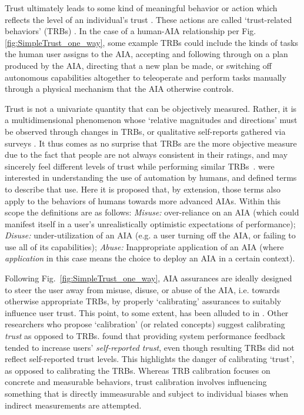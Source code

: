 Trust ultimately leads to some kind of meaningful behavior or action which reflects the level of an individual's trust \cite{Lewis1985-pr}. 
These actions are called `trust-related behaviors' (TRBs) \cite{McKnight2001-fa}. 
In the case of a human-AIA relationship per Fig. \ref{fig:SimpleTrust_one_way}, 
some example TRBs could include the kinds of tasks the human user assigns to the AIA, accepting and following through on a plan produced by the AIA, directing that a new plan be made, or switching off autonomous capabilities altogether to teleoperate and perform tasks manually through a physical mechanism that the AIA otherwise controls.  

Trust is not a univariate quantity that can be objectively measured. Rather, it is a multidimensional phenomenon whose `relative magnitudes and directions' must be observed through changes in TRBs, or qualitative self-reports gathered via surveys \cite{Muir1996-gt}. It thus comes as no surprise that TRBs are the more objective measure due to the fact that people are not always consistent in their ratings, and may sincerely feel different levels of trust while performing similar TRBs~\cite{Dzindolet2003-ts}. \citet{Parasuraman1997-co} were interested in understanding the use of automation by humans, and defined terms to describe that use. Here it is proposed that, by extension, those terms also apply to the behaviors of humans towards more advanced AIAs. Within this scope the definitions are as follows: \textit{Misuse:} over-reliance on an AIA (which could manifest itself in a user's unrealistically optimistic expectations of performance); \textit{Disuse:} under-utilization of an AIA (e.g. a user turning off the AIA, or failing to use all of its capabilities); \textit{Abuse:} Inappropriate application of an AIA (where \emph{application} in this case means the choice to deploy an AIA in a certain context).

Following Fig.~\ref{fig:SimpleTrust_one_way}, AIA assurances are ideally designed to steer the user away from misuse, disuse, or abuse of the AIA, i.e. towards otherwise appropriate TRBs, by properly `calibrating' assurances to suitably influence user trust. This point, to some extent, has been alluded to in \cite{Muir1994-ow,Lillard2015-yg,Lee2004-pv,Hutchins2015-if}. Other researchers who propose `calibration' (or related concepts) suggest calibrating \emph{trust} as opposed to TRBs. \citet{Dzindolet2003-ts} found that providing system performance feedback tended to increase users' \textit{self-reported trust}, even though resulting TRBs did not reflect self-reported trust levels. This highlights the danger of calibrating `trust', as opposed to calibrating the TRBs. Whereas TRB calibration focuses on concrete and measurable behaviors, trust calibration involves influencing something that is directly immeasurable and subject to individual biases when indirect measurements are attempted.
